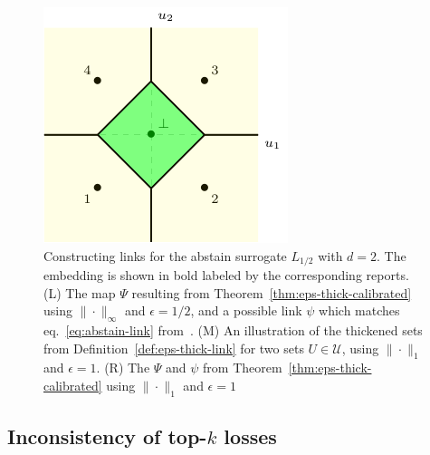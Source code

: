 \documentclass[12pt]{article}
\newcommand{\Comments}{1}
\newcommand{\mytodo}[2]{\ifnum\Comments=1%
  \todo[linecolor=#1!80!black,backgroundcolor=#1,bordercolor=#1!80!black]{#2}\fi}
\newcommand{\btw}[1]{}%
\newcommand{\U}{\mathcal{U}}
\newcommand{\elltopk}{\ell_{\text{top-$k$}}}
\begin{document}
\begin{figure}
\begin{center}
\begin{minipage}{0.3\linewidth}
\end{minipage}\hfill
\begin{minipage}{0.3\linewidth}
\includegraphics[width=\linewidth]{./tikz/abstain-link-l1.pdf}
\end{minipage}\hfill
\caption{Constructing links for the abstain surrogate $L_{1/2}$ with $d=2$. The embedding is shown in bold labeled by the corresponding reports. (L) The map $\Psi$ resulting from Theorem~\ref{thm:eps-thick-calibrated} using $\|\cdot\|_\infty$ and $\epsilon = 1/2$, and a possible link $\psi$ which matches eq.~\eqref{eq:abstain-link} from~\cite{ramaswamy2018consistent}.  (M) An illustration of the thickened sets from Definition~\ref{def:eps-thick-link} for two sets $U \in \U$, using $\|\cdot\|_1$ and $\epsilon = 1$. (R) The $\Psi$ and $\psi$ from Theorem~\ref{thm:eps-thick-calibrated} using $\|\cdot\|_1$ and $\epsilon = 1$}
\label{fig:abstain-links}
\end{center}
\end{figure}

\subsection{Inconsistency of top-$k$ losses}

\btw{The story we discussed: YK show $L'$ is inconsistent.  Our framework lets us ask: with what discrete loss \emph{is} $L'$ consistent?  (It also assures us that $L'$ is consistent for something...) Oh look, $L'$ embeds something which is $\elltopk$ plus some other term, so (a) we can see very clearly what $L'$ ``is doing'', and (b) we can see where to look for distributions yielding inconsistency, namely ones for which we actually prefer to report a set with $|r|<k$.}
\end{document}
